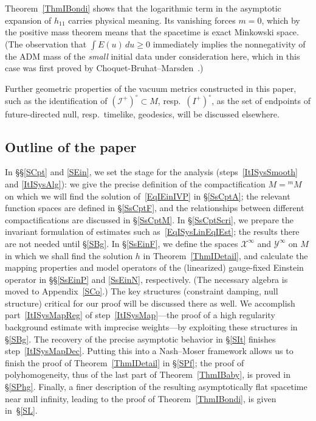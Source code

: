 \documentclass[reqno,11pt,letterpaper]{amsart}
\numberwithin{equation}{section}
\numberwithin{figure}{section}
\theoremstyle{definition}
\theoremstyle{remark}
\newcommand{\mc}{\mathcal}
\newcommand{\cX}{\mc X}
\newcommand{\cY}{\mc Y}
\newcommand{\ms}{\mathscr}
\newcommand{\scri}{\ms I}
\begin{document}
Theorem~\ref{ThmIBondi} shows that the logarithmic term in the asymptotic expansion of $h_{1 1}$ carries physical meaning. Its vanishing forces $m=0$, which by the positive mass theorem means that the spacetime is exact Minkowski space. (The observation that $\int E(u)\,d u\geq 0$ immediately implies the nonnegativity of the ADM mass of the \emph{small} initial data under consideration here, which in this case was first proved by Choquet-Bruhat--Marsden~\cite{ChoquetBruhatMarsdenMass}.)

Further geometric properties of the vacuum metrics constructed in this paper, such as the identification of $(\scri^+)^\circ\subset M$, resp.\ $(I^+)^\circ$, as the set of endpoints of future-directed null, resp.\ timelike, geodesics,  will be discussed elsewhere.




\subsection{Outline of the paper}
\label{SsIOut}

In \S\S\ref{SCpt} and \ref{SEin}, we set the stage for the analysis (steps~\ref{ItISysSmooth} and \ref{ItISysAlg}): we give the precise definition of the compactification $M={}^m\!M$ on which we will find the solution of~\eqref{EqIEinIVP} in \S\ref{SsCptA}; the relevant function spaces are defined in \S\ref{SsCptF}, and the relationships between different compactifications are discussed in \S\ref{SsCptM}. In \S\ref{SsCptScri}, we prepare the invariant formulation of estimates such as~\eqref{EqISysLinEqIEst}; the results there are not needed until \S\ref{SBg}. In \S\ref{SsEinF}, we define the spaces $\cX^\infty$ and $\cY^\infty$ on $M$ in which we shall find the solution $h$ in Theorem~\ref{ThmIDetail}, and calculate the mapping properties and model operators of the (linearized) gauge-fixed Einstein operator in \S\S\ref{SsEinP} and \ref{SsEinN}, respectively. (The necessary algebra is moved to Appendix~\ref{SCo}.) The key structures (constraint damping, null structure) critical for our proof will be discussed there as well. We accomplish part~\ref{ItISysMapReg} of step~\ref{ItISysMap}---the proof of a high regularity background estimate with imprecise weights---by exploiting these structures in \S\ref{SBg}. The recovery of the precise asymptotic behavior in \S\ref{SIt} finishes step~\ref{ItISysMapDec}. Putting this into a Nash--Moser framework allows us to finish the proof of Theorem~\ref{ThmIDetail} in \S\ref{SPf}; the proof of polyhomogeneity, thus of the last part of Theorem~\ref{ThmIBaby}, is proved in \S\ref{SPhg}.  Finally, a finer description of the resulting asymptotically flat spacetime near null infinity, leading to the proof of Theorem~\ref{ThmIBondi}, is given in~\S\ref{SL}.
\end{document}
